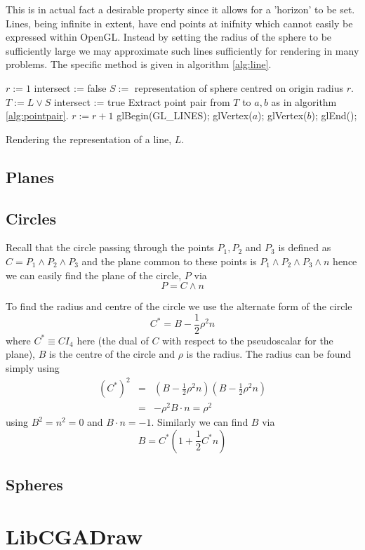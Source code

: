 This is in actual fact a desirable property since it allows for a 'horizon' to
be set. Lines, being infinite in extent, have end points at inifnity which
cannot easily be expressed within OpenGL. Instead by setting the radius of the sphere
to be sufficiently large we may approximate such lines sufficiently for rendering
in many problems. The specific method is given in algorithm \ref{alg:line}.

\begin{fancyalg}
\begin{algorithmic}[1]
\STATE $r := 1$
\REPEAT
\STATE intersect := false
\STATE $S := $ representation of sphere centred on origin radius $r$.
\STATE $T := L \vee S$
\STATE intersect := true
\STATE Extract point pair from $T$ to $a,b$ as in algorithm \ref{alg:pointpair}.
\ENDIF
\STATE $r := r+1$
\STATE glBegin(GL\_LINES);
\STATE glVertex($a$); glVertex($b$);
\STATE glEnd();
\ENDIF
\end{algorithmic}
\caption{\label{alg:line}Rendering the representation of a line, $L$.}
\end{fancyalg}

\subsection{Planes}
\subsection{Circles}

Recall that the circle passing through the points $P_1, P_2$ and $P_3$
is defined
as $C = P_1 \wedge P_2 \wedge P_3$ and the plane common to these points is
$P_1 \wedge P_2 \wedge P_3 \wedge n$ hence we can easily find the plane of 
the circle,
$P$ via
\[
P = C \wedge n
\]

To find the radius and centre of the circle we use the alternate form of the 
circle
\cite{wareham_lasenby}
\[
C^* = B - \frac{1}{2}\rho^2n
\]
where $C^* \equiv CI_4$ here (the dual of $C$ with respect to the pseudoscalar 
for the plane), $B$ is the centre of the circle and $\rho$ is the radius. The
radius can be found simply using
\begin{eqnarray*}
(C^*)^2 & = & \left(B - \frac{1}{2}\rho^2n\right)\left(B - \frac{1}{2}\rho^2n\right) \\
        & = & -\rho^2 B\cdot n = \rho^2
\end{eqnarray*}
using $B^2 = n^2 = 0$ and $B \cdot n = -1$. Similarly we can find $B$ via
\[
B = C^* \left( 1 + \frac{1}{2}C^*n \right)
\]

\subsection{Spheres}

\section{LibCGADraw}
